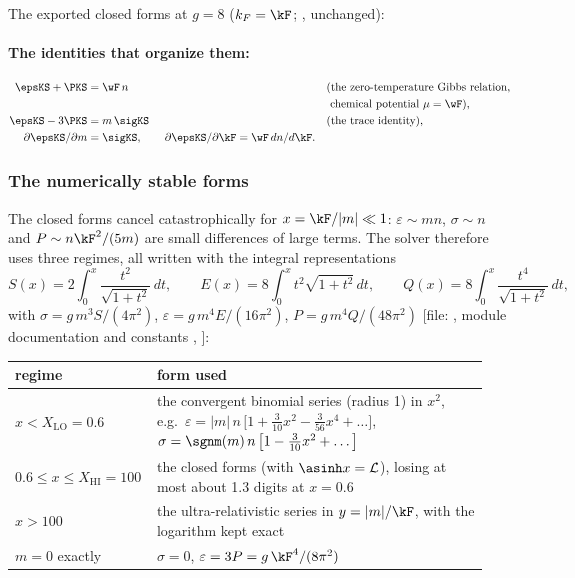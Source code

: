 The exported closed forms at $g=8$ ($k_F=\kF$;
, unchanged):

{\footnotesize

}

\paragraph{The identities that organize them:}
\begin{align*}
  \epsKS+\PKS&=\wF\,n &&\text{(the zero-temperature Gibbs relation,}\\
  & &&\ \text{chemical potential } \mu=\wF),\\
  \epsKS-3\PKS&=m\,\sigKS &&\text{(the trace identity)},\\
  \partial\epsKS/\partial m&=\sigKS,\qquad \partial\epsKS/\partial\kF=\wF\,dn/d\kF .
\end{align*}
 

\subsubsection{The numerically stable forms}
\label{sec:3.7.5}

The closed forms cancel catastrophically for $x=\kF/|m|\ll1$: $\varepsilon\sim mn$, $\sigma\sim n$ and
$P\sim n\kF^2/(5m)$ are small differences of large terms. The solver therefore uses three regimes, all
written with the integral representations
\[
  S(x)=2\int_0^x\frac{t^2}{\sqrt{1+t^2}}\,dt,\qquad E(x)=8\int_0^x t^2\sqrt{1+t^2}\,dt,\qquad
  Q(x)=8\int_0^x\frac{t^4}{\sqrt{1+t^2}}\,dt,
\]
with $\sigma=g\,m^3S/(4\pi^2)$, $\varepsilon=g\,m^4E/(16\pi^2)$, $P=g\,m^4Q/(48\pi^2)$ [file:
, module documentation and constants
, ]:

{\small
\begin{longtable}{@{}p{0.25\linewidth}p{0.69\linewidth}@{}}
\toprule
\raggedright regime & \raggedright form used \tabularnewline
\midrule
\endhead
\raggedright $x<X_{\mathrm{LO}}=0.6$ & \raggedright the convergent binomial series (radius 1) in $x^2$, e.g.\ $\varepsilon=|m|\,n\,\bigl[1+\frac{3}{10}x^2-\frac{3}{56}x^4+\dots\bigr]$, $\sigma=\sgnm(m)\,n\,\bigl[1-\frac{3}{10}x^2+\dots\bigr]$ \tabularnewline
\raggedright $0.6\leq x\leq X_{\mathrm{HI}}=100$ & \raggedright the closed forms (with $\asinh x=\mathcal L$), losing at most about 1.3 digits at $x=0.6$ \tabularnewline
\raggedright $x>100$ & \raggedright the ultra-relativistic series in $y=|m|/\kF$, with the logarithm kept exact \tabularnewline
\raggedright $m=0$ exactly & \raggedright $\sigma=0$, $\varepsilon=3P=g\,\kF^4/(8\pi^2)$ \tabularnewline
\bottomrule
\end{longtable}
}


